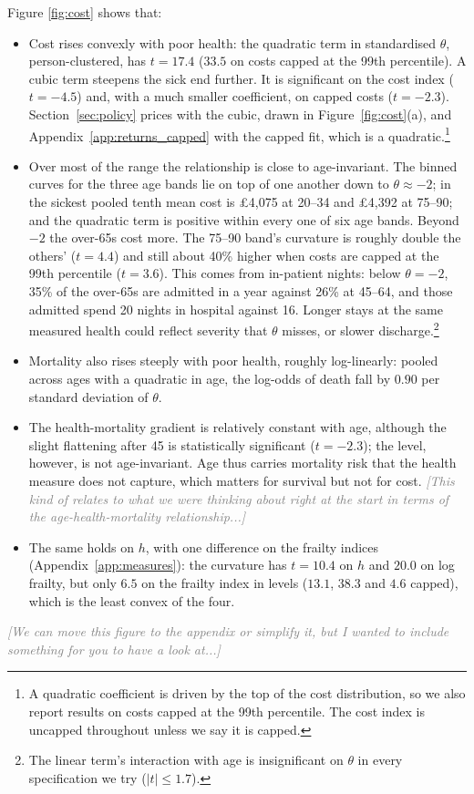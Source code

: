 \documentclass[11pt]{article}
\newcommand{\note}[1]{\textcolor{gray}{\textit{[#1]}}}
\begin{document}
	
	Figure \ref{fig:cost} shows that:
\begin{itemize}
	\item Cost rises convexly with poor health: the quadratic term in standardised $\theta$, person-clustered, has $t = 17.4$ ($33.5$ on costs capped at the 99th percentile). A cubic term steepens the sick end further. It is significant on the cost index ($t=-4.5$) and, with a much smaller coefficient, on capped costs ($t=-2.3$). Section~\ref{sec:policy} prices with the cubic, drawn in Figure~\ref{fig:cost}(a), and Appendix~\ref{app:returns_capped} with the capped fit, which is a quadratic.\footnote{A quadratic coefficient is driven by the top of the cost distribution, so we also report results on costs capped at the 99th percentile. The cost index is uncapped throughout unless we say it is capped.}
	\item Over most of the range the relationship is close to age-invariant. The binned curves for the three age bands lie on top of one another down to $\theta \approx -2$; in the sickest pooled tenth mean cost is \pounds4{,}075 at 20--34 and \pounds4{,}392 at 75--90; and the quadratic term is positive within every one of six age bands. Beyond $-2$ the over-65s cost more. The 75--90 band's curvature is roughly double the others' ($t = 4.4$) and still about 40\% higher when costs are capped at the 99th percentile ($t = 3.6$). This comes from in-patient nights: below $\theta = -2$, 35\% of the over-65s are admitted in a year against 26\% at 45--64, and those admitted spend 20 nights in hospital against 16. Longer stays at the same measured health could reflect severity that $\theta$ misses, or slower discharge.\footnote{The linear term's interaction with age is insignificant on $\theta$ in every specification we try ($|t| \le 1.7$).}
	\item Mortality also rises steeply with poor health, roughly log-linearly: pooled across ages with a quadratic in age, the log-odds of death fall by $0.90$ per standard deviation of $\theta$.
	\item The health-mortality gradient is relatively constant with age, although the slight flattening after 45 is statistically significant ($t=-2.3$); the level, however, is not age-invariant. Age thus carries mortality risk that the health measure does not capture, which matters for survival but not for cost. \note{This kind of relates to what we were thinking about right at the start in terms of the age-health-mortality relationship...}
	\item The same holds on $h$, with one difference on the frailty indices (Appendix~\ref{app:measures}): the curvature has $t = 10.4$ on $h$ and $20.0$ on log frailty, but only $6.5$ on the frailty index in levels ($13.1$, $38.3$ and $4.6$ capped), which is the least convex of the four.
\end{itemize}
\note{We can move this figure to the appendix or simplify it, but I wanted to include something for you to have a look at...}
\end{document}
